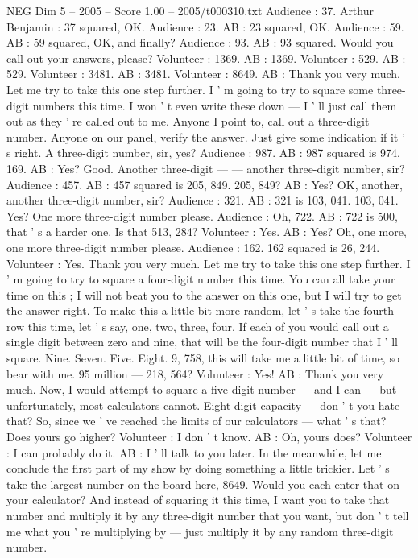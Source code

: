\begin{textsample}{NEG Dim 5 – 2005 – Score 1.00 – 2005/t000310.txt}
Audience : 37.
Arthur Benjamin : 37 squared, OK.
Audience : 23.
AB : 23 squared, OK.
Audience : 59.
AB : 59 squared, OK, and finally?
Audience : 93.
AB : 93 squared.
Would you call out your answers, please?
Volunteer : 1369.
AB : 1369.
Volunteer : 529.
AB : 529.
Volunteer : 3481.
AB : 3481.
Volunteer : 8649.
AB : Thank you very much.
Let me try to take this one step further.
I ' m going to try to square some three-digit numbers this time.
I won ' t even write these down — I ' ll just call them out as they ' re called out to me.
Anyone I point to, call out a three-digit number.
Anyone on our panel, verify the answer.
Just give some indication if it ' s right.
A three-digit number, sir, yes?
Audience : 987.
AB : 987 squared is 974, 169.
AB : Yes?
Good.
Another three-digit — — another three-digit number, sir?
Audience : 457.
AB : 457 squared is 205, 849. 205, 849?
AB : Yes?
OK, another, another three-digit number, sir?
Audience : 321.
AB : 321 is 103, 041. 103, 041.
Yes?
One more three-digit number please.
Audience : Oh, 722.
AB : 722 is 500, that ' s a harder one.
Is that 513, 284?
Volunteer : Yes.
AB : Yes?
Oh, one more, one more three-digit number please.
Audience : 162. 162 squared is 26, 244.
Volunteer : Yes.
Thank you very much.
Let me try to take this one step further.
I ' m going to try to square a four-digit number this time.
You can all take your time on this ; I will not beat you to the answer on this one, but I will try to get the answer right.
To make this a little bit more random, let ' s take the fourth row this time, let ' s say, one, two, three, four.
If each of you would call out a single digit between zero and nine, that will be the four-digit number that I ' ll square.
Nine.
Seven.
Five.
Eight. 9, 758, this will take me a little bit of time, so bear with me. 95 million — 218, 564?
Volunteer : Yes!
AB : Thank you very much.
Now, I would attempt to square a five-digit number — and I can — but unfortunately, most calculators cannot.
Eight-digit capacity — don ' t you hate that?
So, since we ' ve reached the limits of our calculators — what ' s that?
Does yours go higher?
Volunteer : I don ' t know.
AB : Oh, yours does?
Volunteer : I can probably do it.
AB : I ' ll talk to you later.
In the meanwhile, let me conclude the first part of my show by doing something a little trickier.
Let ' s take the largest number on the board here, 8649.
Would you each enter that on your calculator?
And instead of squaring it this time, I want you to take that number and multiply it by any three-digit number that you want, but don ' t tell me what you ' re multiplying by — just multiply it by any random three-digit number.

\end{textsample}
